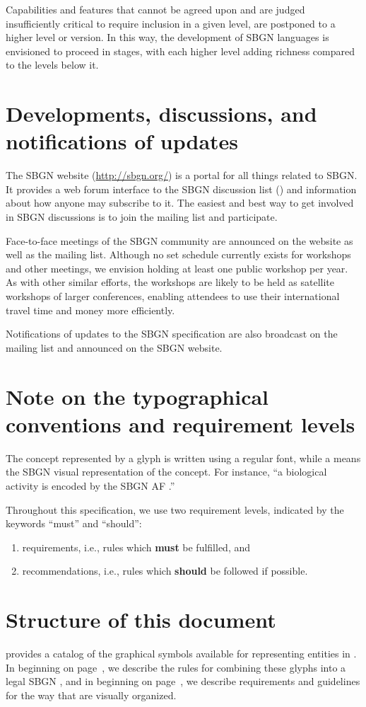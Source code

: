 Capabilities and features that cannot be agreed upon and are judged
insufficiently critical to require inclusion in a given level, are
postponed to a higher level or version. In this way, the development
of SBGN languages is envisioned to proceed in stages, with each higher
level adding richness compared to the levels below it.

\section{Developments, discussions, and notifications of updates}
\label{sec:discussions}

The SBGN website (\url{http://sbgn.org/}) is a portal for all things 
related to SBGN. It provides a web forum interface to the SBGN discussion list () and information about how anyone may subscribe to it. The easiest and best way to get involved in SBGN discussions is to join the mailing list and participate.

Face-to-face meetings of the SBGN community are announced on the website as well as the mailing list. Although no set schedule currently exists for workshops and other meetings, we envision holding at least one public workshop per year. As with other similar efforts, the workshops are likely to be held as satellite workshops of larger conferences, enabling attendees to use their international travel time and money more efficiently.

Notifications of updates to the SBGN specification are also broadcast on 
the mailing list and announced on the SBGN website.

\section{Note on the typographical conventions and requirement levels}
\label{sec:notes}
The concept represented by a glyph is written using a regular font, while a 
 means the SBGN visual representation of the concept. For 
instance, ``a biological activity is encoded by the SBGN AF .''

Throughout this specification, we use two requirement levels, indicated by the keywords ``must'' and ``should'':
\begin{enumerate}
  \item requirements, i.e., rules which \textbf{must} be fulfilled, and
  \item recommendations, i.e., rules which \textbf{should} be followed if
  possible. 
\end{enumerate}


\section{Structure of this document}  provides a catalog of the graphical symbols available for representing entities in \AFs. In  beginning on page~\pageref{chp:af:grammar}, we describe the rules for combining these glyphs into a legal SBGN \AFm, and in  beginning on page~\pageref{chp:af:layout}, we describe requirements and guidelines for the way that \AFms are visually organized.
